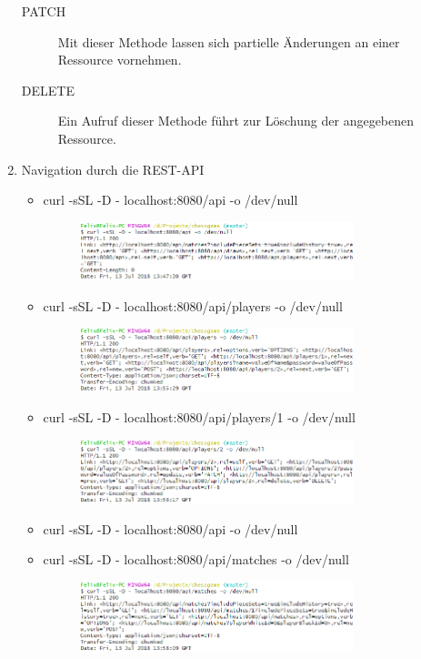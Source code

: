 \begin{enumerate}
\begin{description}
			\item[PATCH] Mit dieser Methode lassen sich partielle Änderungen an einer Ressource vornehmen.
			\item[DELETE] Ein Aufruf dieser Methode führt zur Löschung der angegebenen Ressource.
		\end{description}
	\item Navigation durch die \gls{REST}-\gls{API}
		\begin{itemize}
			\item curl -sSL -D - localhost:8080/api -o /dev/null
				\begin{figure}[h]
					\includegraphics[width=0.8\textwidth]{images/question3.1.png}
				\end{figure}
			\item curl -sSL -D - localhost:8080/api/players -o /dev/null
				\begin{figure}[h]
					\includegraphics[width=0.8\textwidth]{images/question3.2.png}
				\end{figure}
			\item curl -sSL -D - localhost:8080/api/players/1 -o /dev/null
				\begin{figure}[h]
					\includegraphics[width=0.8\textwidth]{images/question3.3.png}
				\end{figure}
			\item curl -sSL -D - localhost:8080/api -o /dev/null
			\item curl -sSL -D - localhost:8080/api/matches -o /dev/null
				\begin{figure}[h]
					\includegraphics[width=0.8\textwidth]{images/question3.6.png}

\end{figure}
\end{itemize}
\end{enumerate}
